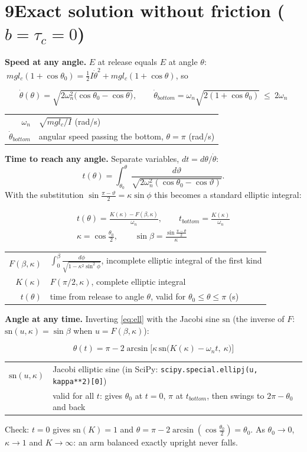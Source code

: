 \documentclass[11pt]{article}
\makeatletter
\newcommand{\where}[1]{\par\vspace{-2pt}{\small\color{muted}\textit{where}}\par\vspace{-2pt}
  {\small\renewcommand{\arraystretch}{1.08}\begin{tabular}{@{}>{$}r<{$}@{\;\;}l@{}}#1\end{tabular}}}
\makeatother
\begin{document}
\section*{9\quad Exact solution without friction ($b=\tau_c=0$)}
\textbf{Speed at any angle.} $E$ at release equals $E$ at angle $\theta$:
$\ m g l_c(1+\cos\theta_0)=\tfrac12 I\dot\theta^2+m g l_c(1+\cos\theta)$, so
\begin{result}
\begin{equation}
\dot\theta(\theta)=\sqrt{2\omega_n^2\big(\cos\theta_0-\cos\theta\big)},\qquad
\dot\theta_{bottom}=\omega_n\sqrt{2(1+\cos\theta_0)}\ \le\ 2\omega_n \label{eq:speed}
\end{equation}
\where{\omega_n & $\sqrt{m g l_c/I}$ (rad/s)\\ \dot\theta_{bottom} & angular speed passing the bottom, $\theta=\pi$ (rad/s)}
\end{result}

\textbf{Time to reach any angle.} Separate variables, $dt=d\theta/\dot\theta$:
\begin{equation}
t(\theta)=\int_{\theta_0}^{\theta}\frac{d\vartheta}{\sqrt{2\omega_n^2(\cos\theta_0-\cos\vartheta)}} . \label{eq:tint}
\end{equation}
With the substitution $\sin\frac{\pi-\vartheta}{2}=\kappa\sin\phi$ this becomes a standard elliptic integral:
\begin{result}
\begin{gather}
t(\theta)=\frac{K(\kappa)-F(\beta,\kappa)}{\omega_n},\qquad
t_{bottom}=\frac{K(\kappa)}{\omega_n} \label{eq:ell}\\[2pt]
\kappa=\cos\frac{\theta_0}{2},\qquad
\sin\beta=\frac{\sin\frac{\pi-\theta}{2}}{\kappa} \nonumber
\end{gather}
\where{F(\beta,\kappa) & $\displaystyle\int_0^{\beta}\frac{d\phi}{\sqrt{1-\kappa^2\sin^2\phi}}$, incomplete elliptic integral of the first kind\\ K(\kappa) & $F(\pi/2,\kappa)$, complete elliptic integral\\ t(\theta) & time from release to angle $\theta$, valid for $\theta_0\le\theta\le\pi$ (s)}
\end{result}

\textbf{Angle at any time.} Inverting \eqref{eq:ell} with the Jacobi sine $\mathrm{sn}$ (the inverse of $F$: $\mathrm{sn}(u,\kappa)=\sin\beta$ when $u=F(\beta,\kappa)$):
\begin{result}
\begin{equation}
\theta(t)=\pi-2\arcsin\!\Big[\kappa\,\mathrm{sn}\big(K(\kappa)-\omega_n t,\ \kappa\big)\Big] \label{eq:sn}
\end{equation}
\where{\mathrm{sn}(u,\kappa) & Jacobi elliptic sine (in SciPy: \texttt{scipy.special.ellipj(u, kappa**2)[0]})\\ & valid for all $t$: gives $\theta_0$ at $t=0$, $\pi$ at $t_{bottom}$, then swings to $2\pi-\theta_0$ and back}
\end{result}
Check: $t=0$ gives $\mathrm{sn}(K)=1$ and $\theta=\pi-2\arcsin(\cos\frac{\theta_0}{2})=\theta_0$. As $\theta_0\to0$, $\kappa\to1$ and $K\to\infty$: an arm balanced exactly upright never falls.
\end{document}

